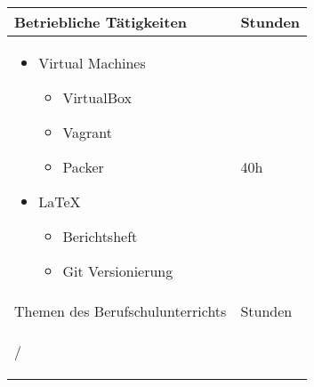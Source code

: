 \begin{center}
	\begin{tabular}{ | p{30em}  | m{6em} | }
	\hline
	\rowcolor{Gray}
	Betriebliche T\"{a}tigkeiten & Stunden \\ \hline
	\begin{itemize}
	\item Virtual Machines
		\begin{itemize}
		\item VirtualBox
		\item Vagrant
		\item Packer
		\end{itemize}
	\item LaTeX
		\begin{itemize}
		\item Berichtsheft
		\item Git Versionierung
		\end{itemize}
	\end{itemize} & \begin{center} 40h \end{center} \\ \hline
	\rowcolor{Gray}
	Themen des Berufschulunterrichts & Stunden \\ \hline
	\begin{center} / \end{center} & \begin{center}  \end{center} \\ \hline
	\end{tabular}
\end{center}